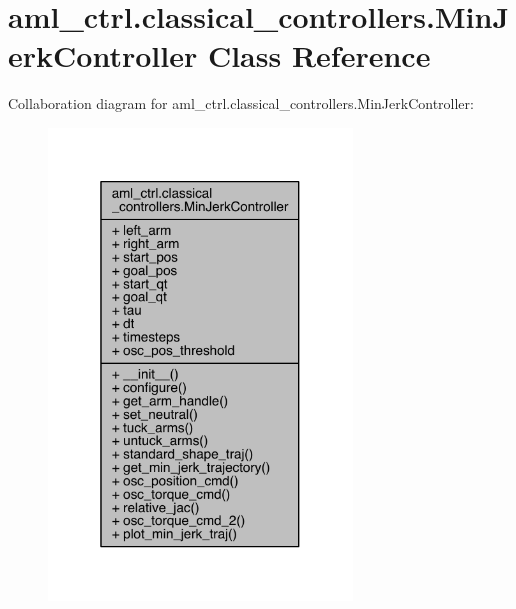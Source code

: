 \hypertarget{classaml__ctrl_1_1classical__controllers_1_1_min_jerk_controller}{}\section{aml\+\_\+ctrl.\+classical\+\_\+controllers.\+Min\+Jerk\+Controller Class Reference}
\label{classaml__ctrl_1_1classical__controllers_1_1_min_jerk_controller}


Collaboration diagram for aml\+\_\+ctrl.\+classical\+\_\+controllers.\+Min\+Jerk\+Controller\+:
\nopagebreak
\begin{figure}[H]
\begin{center}
\leavevmode
\includegraphics[width=229pt]{classaml__ctrl_1_1classical__controllers_1_1_min_jerk_controller__coll__graph}
\end{center}
\end{figure}
